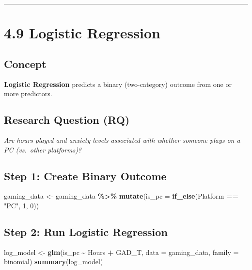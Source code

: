 \documentclass[
]{book}
\newenvironment{Shaded}{\begin{snugshade}}{\end{snugshade}}
\newcommand{\AttributeTok}[1]{\textcolor[rgb]{0.13,0.29,0.53}{#1}}
\newcommand{\DecValTok}[1]{\textcolor[rgb]{0.00,0.00,0.81}{#1}}
\newcommand{\FunctionTok}[1]{\textcolor[rgb]{0.13,0.29,0.53}{\textbf{#1}}}
\newcommand{\NormalTok}[1]{#1}
\newcommand{\OtherTok}[1]{\textcolor[rgb]{0.56,0.35,0.01}{#1}}
\newcommand{\SpecialCharTok}[1]{\textcolor[rgb]{0.81,0.36,0.00}{\textbf{#1}}}
\newcommand{\StringTok}[1]{\textcolor[rgb]{0.31,0.60,0.02}{#1}}
\begin{document}
\begin{center}\rule{0.5\linewidth}{0.5pt}\end{center}

\section{4.9 Logistic Regression}\label{logistic-regression}

\subsection{Concept}\label{concept-8}

\textbf{Logistic Regression} predicts a binary (two-category) outcome from one or more predictors.

\subsection{Research Question (RQ)}\label{research-question-rq-4}

\emph{Are hours played and anxiety levels associated with whether someone plays on a PC (vs.~other platforms)?}

\subsection{Step 1: Create Binary Outcome}\label{step-1-create-binary-outcome}

\begin{Shaded}
\begin{Highlighting}[]
\NormalTok{gaming\_data }\OtherTok{\textless{}{-}}\NormalTok{ gaming\_data }\SpecialCharTok{\%\textgreater{}\%}
  \FunctionTok{mutate}\NormalTok{(}\AttributeTok{is\_pc =} \FunctionTok{if\_else}\NormalTok{(Platform }\SpecialCharTok{==} \StringTok{"PC"}\NormalTok{, }\DecValTok{1}\NormalTok{, }\DecValTok{0}\NormalTok{))}
\end{Highlighting}
\end{Shaded}

\subsection{Step 2: Run Logistic Regression}\label{step-2-run-logistic-regression}

\begin{Shaded}
\begin{Highlighting}[]
\NormalTok{log\_model }\OtherTok{\textless{}{-}} \FunctionTok{glm}\NormalTok{(is\_pc }\SpecialCharTok{\textasciitilde{}}\NormalTok{ Hours }\SpecialCharTok{+}\NormalTok{ GAD\_T, }\AttributeTok{data =}\NormalTok{ gaming\_data, }\AttributeTok{family =}\NormalTok{ binomial)}
\FunctionTok{summary}\NormalTok{(log\_model)}
\end{Highlighting}
\end{Shaded}
\end{document}
